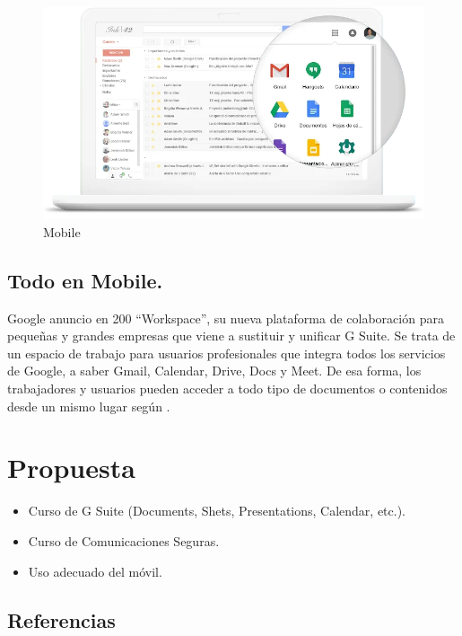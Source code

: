 \documentclass[
  letterpaper,
  DIV=11,
  numbers=noendperiod]{scrartcl}
\providecommand{\tightlist}{%
  \setlength{\itemsep}{0pt}\setlength{\parskip}{0pt}}\usepackage{longtable,booktabs,array}
\begin{document}
\begin{figure}

{\centering \includegraphics{media/mobile.png}

}

\caption{Mobile}

\end{figure}

\hypertarget{todo-en-mobile.-1}{%
\subsection{Todo en Mobile.}\label{todo-en-mobile.-1}}

Google anuncio en 200 ``Workspace'', su nueva plataforma de colaboración
para pequeñas y grandes empresas que viene a sustituir y unificar G
Suite. Se trata de un espacio de trabajo para usuarios profesionales que
integra todos los servicios de Google, a saber Gmail, Calendar, Drive,
Docs y Meet. De esa forma, los trabajadores y usuarios pueden acceder a
todo tipo de documentos o contenidos desde un mismo lugar según
\textcite{garciaSuiteAhoraEs2020}.

\hypertarget{propuesta}{%
\section{Propuesta}\label{propuesta}}

\begin{itemize}
\tightlist
\item
  Curso de G Suite (Documents, Shets, Presentations, Calendar, etc.).
\item
  Curso de Comunicaciones Seguras.
\item
  Uso adecuado del móvil.
\end{itemize}

\hypertarget{referencias}{%
\subsection{Referencias}\label{referencias}}


\printbibliography
\end{document}
